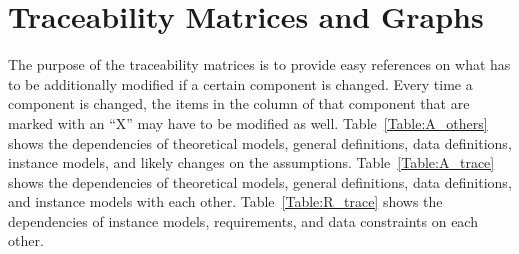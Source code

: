 \documentclass[12pt]{article}
\begin{document}
\section{Traceability Matrices and Graphs}

The purpose of the traceability matrices is to provide easy references on what
has to be additionally modified if a certain component is changed.  Every time a
component is changed, the items in the column of that component that are marked
with an ``X'' may have to be modified as well. Table~\ref{Table:A_others} shows the dependencies of theoretical models, general definitions, data definitions, instance models, and likely changes on the assumptions. Table~\ref{Table:A_trace} shows the dependencies of theoretical models, general definitions, data definitions, and instance models with each other. Table~\ref{Table:R_trace} shows the
dependencies of instance models, requirements, and data constraints on each
other. 



\end{document}

